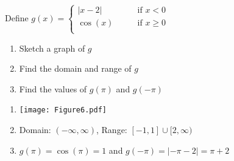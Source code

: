 \documentclass[noinstructornotes]{ximera}
\begin{document}
\begin{problem}
Define 
	$g(x) =   \left\{ \begin{array}{cl}
	|x-2|		 	&	\qquad \text{if } x < 0					\\
	\cos(x)			&	\qquad \text{if }  x \geq 0  	\\		\end{array} \right.  $
\begin{enumerate}	
	\item  Sketch a graph of $g$
	
	\item  Find the domain and range of $g$
		
	
	\item  Find the values of $g(\pi)$ and $g(-\pi)$

	
	\end{enumerate}
	
	\begin{freeResponse}
		\begin{enumerate}
		
		\item 
		
	\begin{image}		
	\texttt{[image: Figure6.pdf]}
	\end{image}

		\item  Domain: $(-\infty,\infty)$, Range: $[-1,1]\cup[2,\infty)$

		\item $g(\pi)=\cos (\pi)=1$ and $g(-\pi)=|-\pi-2|=\pi+2$
		
		\end{enumerate}
	\end{freeResponse}
	
\end{problem}

\begin{instructorNotes}

\end{instructorNotes}
\end{document}
